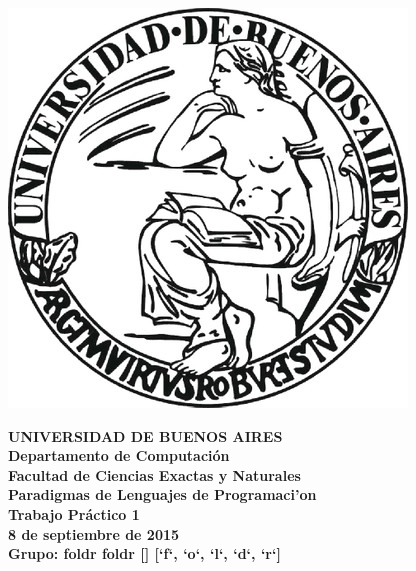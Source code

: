 \documentclass[11pt,a4paper]{article}
\begin{document}

\def\Materia{Paradigmas de Lenguajes de Programaci'on}
\def\Titulo{Trabajo Pr\'{a}ctico 1}
\def\Fecha{8 de septiembre de 2015}


\thispagestyle{empty}

\begin{center}
	\includegraphics[scale = 0.25]{imagenes/logo_uba.jpg}
\end{center}

\begin{center}
	{\textbf{\large UNIVERSIDAD DE BUENOS AIRES}}\\[1.5em]
	{\textbf{\large Departamento de Computaci\'{o}n}}\\[1.5em]
    {\textbf{\large Facultad de Ciencias Exactas y Naturales}}\\
    \vspace{35mm}
    {\LARGE\textbf{\Materia}}\\[1em]    
    \vspace{15mm}
    {\Large \textbf{\Titulo}}\\[1em]
    \vspace{15mm}
    {\textbf{\Large \Fecha}}\\
    \vspace{15mm}
	{\textbf{\Large Grupo: foldr foldr []
[`f`, `o`, `l`, `d`, `r`]}}\\
    \vspace{15mm}
    \textbf{\tablaints}
\end{center}

\newpage
\end{document}
